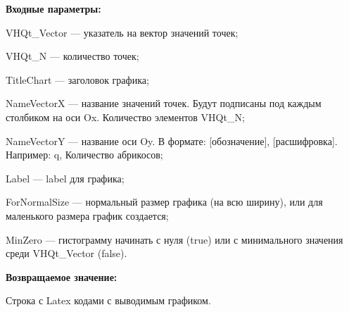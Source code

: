 \textbf{Входные параметры:}
 
VHQt\_Vector --- указатель на вектор значений точек;
 
VHQt\_N --- количество точек;
 
TitleChart --- заголовок графика;
 
NameVectorX --- название значений точек. Будут подписаны под каждым столбиком на оси Ox. Количество элементов VHQt\_N;
 
NameVectorY --- название оси Oy. В формате: [обозначение], [расшифровка]. Например: q, Количество абрикосов;
 
Label --- label для графика;
 
ForNormalSize --- нормальный размер графика (на всю ширину), или для маленького размера график создается;
 
MinZero --- гистограмму начинать с нуля (true) или с минимального значения среди VHQt\_Vector (false).
	
\textbf{Возвращаемое значение:}

Строка с Latex кодами с выводимым графиком.